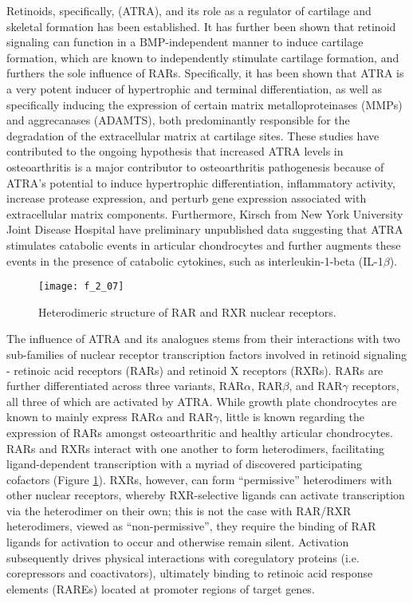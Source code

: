 \begin{refsection}
Retinoids, specifically,  (ATRA), and its role
as a regulator of cartilage and skeletal formation has been
established.\cite{Koyama1999} It has further been shown that retinoid signaling
can function in a BMP-independent manner to induce cartilage formation, which
are known to independently stimulate cartilage formation, and furthers the sole
influence of RARs.\cite{Weston2000} Specifically, it has been shown that ATRA is
a very potent inducer of hypertrophic and terminal differentiation, as well as
specifically inducing the expression of certain matrix metalloproteinases (MMPs)
and aggrecanases (ADAMTS), both predominantly responsible for the degradation of
the extracellular matrix at cartilage
sites.\cite{Wang2002,Iwamoto1994,Koyama1999,Johnson2003} These studies have
contributed to the ongoing hypothesis that increased ATRA levels in
osteoarthritis is a major contributor to osteoarthritis pathogenesis because of
ATRA's potential to induce hypertrophic differentiation, inflammatory activity,
increase protease expression, and perturb gene expression associated with
extracellular matrix components. Furthermore, Kirsch  from New
York University Joint Disease Hospital have preliminary unpublished data
suggesting that ATRA stimulates catabolic events in articular chondrocytes and
further augments these events in the presence of catabolic cytokines, such as
interleukin-1-beta (IL-1${\beta}$).
\begin{figure}[h!] \centering \texttt{[image: f\_2\_07]}
    \caption[Heterodimeric structure of RAR and RXR nuclear receptors.]{Heterodimeric structure of RAR and RXR nuclear receptors.\cite{DeLera2007}}\label{fig:retinoid_receptor_structures} \end{figure}
The influence of ATRA and its analogues stems from their interactions with two
sub-families of nuclear receptor transcription factors involved in retinoid
signaling - retinoic acid receptors (RARs) and retinoid X receptors (RXRs). RARs
are further differentiated across three variants, RAR${\alpha}$, RAR${\beta}$,
and RAR${\gamma}$ receptors, all three of which are activated by
ATRA.\cite{Chambon1996} While growth plate chondrocytes are known to mainly
express RAR${\alpha}$ and RAR${\gamma}$,\cite{Koyama1999} little is known
regarding the expression of RARs amongst osteoarthritic and healthy articular
chondrocytes. RARs and RXRs interact with one another to form heterodimers,
facilitating ligand-dependent transcription with a myriad of discovered
participating cofactors (Figure \ref{fig:retinoid_receptor_structures}). RXRs, however,
can form ``permissive'' heterodimers with other nuclear receptors, whereby
RXR-selective ligands can activate transcription via the heterodimer on their
own; this is not the case with RAR/RXR heterodimers, viewed as
``non-permissive'', they require the binding of RAR ligands for activation to
occur and otherwise remain silent.\cite{Altucci2007} Activation subsequently
drives physical interactions with coregulatory proteins (i.e. corepressors and
coactivators), ultimately binding to retinoic acid response elements (RAREs)
located at promoter regions of target genes.\cite{Germain2002,DeLera2007}


\end{refsection}

